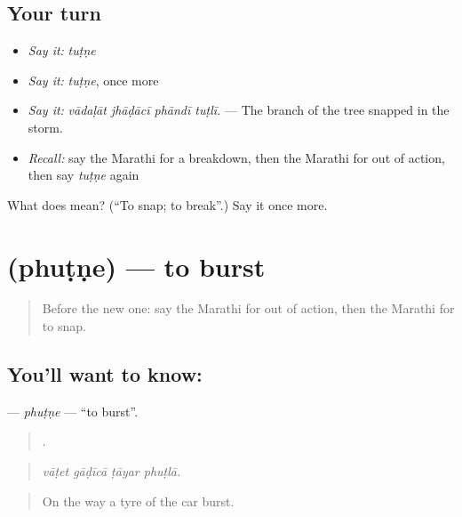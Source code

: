 \subsection*{Your turn}
\begin{itemize}
\raggedright
  \item \emph{Say it:} \emph{tuṭṇe}
  \item \emph{Say it:} \emph{tuṭṇe}, once more
  \item \emph{Say it:} \emph{vādaḷāt jhāḍācī phāndī tuṭlī.} — The branch of the tree snapped in the storm.
  \item \emph{Recall:} say the Marathi for a breakdown, then the Marathi for out of action, then say \emph{tuṭṇe} again
\end{itemize}

\begin{tcolorbox}[breakable,colback=teal!4,colframe=teal!35!black,title={Before you move on}]
What does  mean? (\textquotedblleft{}To snap; to break\textquotedblright{}.) Say it once more.
\end{tcolorbox}
\section[\texorpdfstring{\mr{फुटणे} (phuṭṇe)}{फुटणे (phuṭṇe)}]{ (phuṭṇe) — to burst}

\label{lesson:MR-C431-phutne}



\begin{quote}
Before the new one: say the Marathi for out of action, then the Marathi for to snap.
\end{quote}

\subsection*{You'll want to know: }
\textbf{} — \emph{phuṭṇe} — \textquotedblleft{}to burst\textquotedblright{}.

\begin{quote}
   .
\end{quote}

\begin{quote}
\emph{vāṭet gāḍīcā ṭāyar phuṭlā.}
\end{quote}

\begin{quote}
On the way a tyre of the car burst.
\end{quote}


